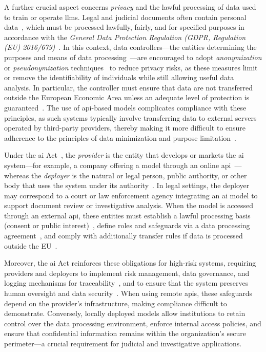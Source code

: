 A further crucial aspect concerns \emph{privacy} and the lawful processing of data used to train or operate \acp{llm}. Legal and judicial documents often contain personal data~\cite[Art.~4]{gdpr2016}, which must be processed lawfully, fairly, and for specified purposes in accordance with the \emph{General Data Protection Regulation (GDPR, Regulation (EU) 2016/679)}~\cite[Art.~5]{gdpr2016}. In this context, data controllers---the entities determining the purposes and means of data processing~\cite[Art.~4.7]{gdpr2016}---are encouraged to adopt \emph{anonymization} or \emph{pseudonymization} techniques~\cite[Art.~4.5]{gdpr2016} to reduce privacy risks, as these measures limit or remove the identifiability of individuals while still allowing useful data analysis.
In particular, the controller must ensure that data are not transferred outside the European Economic Area unless an adequate level of protection is guaranteed~\cite[Art.~44--49]{gdpr2016}. 
The use of \ac{api}-based models complicates compliance with these principles, as such systems typically involve transferring data to external servers operated by third-party providers, thereby making it more difficult to ensure adherence to the principles of data minimization and purpose limitation~\cite[Art.~5.1.c--b]{gdpr2016}.




Under the \ac{ai} Act~\cite{ai_act}, the \emph{provider} is the entity that develops or markets the \ac{ai} system---for example, a company offering a model through an online \ac{api}~\cite[Art.~3.3]{ai_act}---whereas the \emph{deployer} is the natural or legal person, public authority, or other body that uses the system under its authority~\cite[Art.~3.4]{ai_act}. In legal settings, the deployer may correspond to a court or law enforcement agency integrating an \ac{ai} model to support document review or investigative analysis. When the model is accessed through an external \ac{api}, these entities must establish a lawful processing basis (\eg consent or public interest)~\cite[Art.~6 and~9]{gdpr2016}, define roles and safeguards via a data processing agreement~\cite[Art.~28.3]{gdpr2016}, and comply with additionally transfer rules if data is processed outside the EU~\cite[Art.~44--49]{gdpr2016}. 

Moreover, the \ac{ai} Act reinforces these obligations for high-risk systems, requiring providers and deployers to implement risk management, data governance, and logging mechanisms for traceability~\cite[Art.~9--12]{ai_act}, and to ensure that the system preserves human oversight and data security~\cite[Art.~14--15]{ai_act}. When using remote \acp{api}, these safeguards depend on the provider's infrastructure, making compliance difficult to demonstrate. Conversely, locally deployed models allow institutions to retain control over the data processing environment, enforce internal access policies, and ensure that confidential information remains within the organization's secure perimeter---a crucial requirement for judicial and investigative applications.

